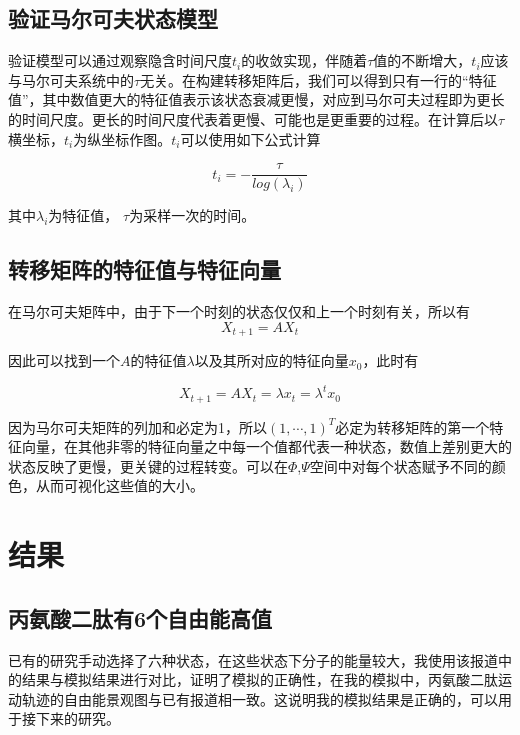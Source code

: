 \documentclass[a4paper]{article}
\begin{document}
\begin{CJK}{UTF8}{gbsn}
\begin{sloppypar}
	\subsection{验证马尔可夫状态模型}

验证模型可以通过观察隐含时间尺度$t_{i}$的收敛实现，伴随着$\tau$值的不断增大，$t_{i}$应该与马尔可夫系统中的$\tau$无关。在构建转移矩阵后，我们可以得到只有一行的“特征值”，其中数值更大的特征值表示该状态衰减更慢，对应到马尔可夫过程即为更长的时间尺度。更长的时间尺度代表着更慢、可能也是更重要的过程\cite{chodera2007automatic}。在计算后以$\tau$横坐标，$t_{i}$为纵坐标作图。$t_{i}$可以使用如下公式计算


\begin{equation}
t_{i} = -\frac{\tau}{log(\lambda_{i})}
\end{equation}

其中$\lambda_{i}$为特征值， $\tau$为采样一次的时间。



	\subsection{转移矩阵的特征值与特征向量}


在马尔可夫矩阵中，由于下一个时刻的状态仅仅和上一个时刻有关，所以有
\begin{equation}
X_{t+1} = AX_{t}
\end{equation}

因此可以找到一个$A$的特征值$\lambda$以及其所对应的特征向量$x_{0}$，此时有

\begin{equation}
X_{t+1} = AX_{t} = \lambda x_{t} = \lambda^{t} x_{0}
\end{equation}




因为马尔可夫矩阵的列加和必定为1，所以$(1, \cdots , 1) ^ {T}$必定为转移矩阵的第一个特征向量，在其他非零的特征向量之中每一个值都代表一种状态，数值上差别更大的状态反映了更慢，更关键的过程转变。可以在$\Phi$,$\Psi$空间中对每个状态赋予不同的颜色，从而可视化这些值的大小。





\section{结果}
	\subsection{丙氨酸二肽有6个自由能高值}
		已有的研究手动选择了六种状态，在这些状态下分子的能量较大，我使用该报道中的结果与模拟结果进行对比，证明了模拟的正确性\cite{chodera2007automatic}，在我的模拟中，丙氨酸二肽运动轨迹的自由能景观图与已有报道相一致。这说明我的模拟结果是正确的，可以用于接下来的研究。


\end{sloppypar}
\end{CJK}
\end{document}
